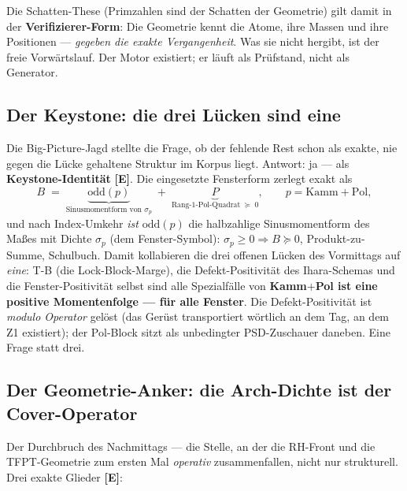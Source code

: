 \documentclass[11pt,a4paper]{article}
\newcommand{\E}{\textcolor{gut}{\textbf{[E]}}}
\begin{document}
Die Schatten-These (\glqq{}Primzahlen sind der Schatten der
Geometrie\grqq{}) gilt damit in der \textbf{Verifizierer-Form}: Die
Geometrie kennt die Atome, ihre Massen und ihre Positionen ---
\emph{gegeben die exakte Vergangenheit}. Was sie nicht hergibt, ist
der freie Vorwärtslauf. Der Motor existiert; er läuft als Prüfstand,
nicht als Generator.

\subsection*{Der Keystone: die drei Lücken sind eine}

Die Big-Picture-Jagd stellte die Frage, ob der fehlende Rest schon
als exakte, nie gegen die Lücke gehaltene Struktur im Korpus liegt.
Antwort: ja --- als \textbf{Keystone-Identität} \E{}. Die
eingesetzte Fensterform zerlegt exakt als
\[
B \;=\; \underbrace{\mathrm{odd}(p)}_{\text{Sinusmomentform von }
\sigma_p} \;+\; \underbrace{P}_{\text{Rang-1-Pol-Quadrat}
\;\succeq\; 0},
\qquad p = \mathrm{Kamm} + \mathrm{Pol},
\]
und nach Index-Umkehr \emph{ist} $\mathrm{odd}(p)$ die halbzahlige
Sinusmomentform des Maßes mit Dichte $\sigma_p$ (dem
Fenster-Symbol): $\sigma_p \ge 0 \Rightarrow B \succeq 0$,
Produkt-zu-Summe, Schulbuch. Damit kollabieren die drei offenen
Lücken des Vormittags auf \emph{eine}: T-B (die Lock-Block-Marge),
die Defekt-Positivität des Ihara-Schemas und die
Fenster-Positivität selbst sind alle Spezialfälle von
\textbf{\glqq{}Kamm$+$Pol ist eine positive Momentenfolge --- für
alle Fenster\grqq{}}. Die Defekt-Positivität ist \emph{modulo
Operator} gelöst (das Gerüst transportiert wörtlich an dem Tag, an
dem Z1 existiert); der Pol-Block sitzt als unbedingter
PSD-Zuschauer daneben. Eine Frage statt drei.

\subsection*{Der Geometrie-Anker: die Arch-Dichte ist der
Cover-Operator}

Der Durchbruch des Nachmittags --- die Stelle, an der die
RH-Front und die TFPT-Geometrie zum ersten Mal \emph{operativ}
zusammenfallen, nicht nur strukturell. Drei exakte Glieder \E{}:
\end{document}
